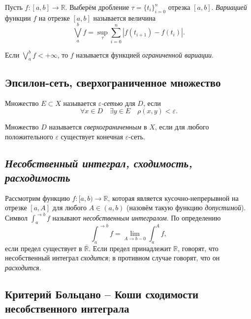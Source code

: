 \begin{definition}
	Пусть \(f \colon [a, b] \to \mathbb{R}\). Выберём дробление \(\tau = \{t_i\}_{i = 0}^n\) отрезка \([a, b]\). \textit{Вариацией}  функции \(f\) на отрезке \([a, b]\) называется величина \[
		\bigvee_a^b f = \sup_\tau \sum_{i = 0}^n |f(t_{i + 1}) - f(t_i)|.
	\]
\end{definition}

\begin{remark}
	Если \(\bigvee\limits_a^b f < +\infty\), то \(f\) называется функцией \textit{ограниченной вариации}.
\end{remark}

\subsection{Эпсилон-сеть, сверхограниченное множество}

\begin{definition}
	Множество \(E \subset X\) называется \textit{\(\varepsilon\)-сетью} для \(D\), если \[
		\forall x \in D \quad \exists y \in E \quad \rho(x, y) < \varepsilon.
	\]
\end{definition}

\begin{definition}
	Множество \(D\) называется \textit{сверхограниченным} в \(X\), если для любого положительного \(\varepsilon\) существует конечная \(\varepsilon\)-сеть.
\end{definition}

\subsection{\itshape Несобственный интеграл, сходимость, расходимость}

\begin{definition}
	Рассмотрим функцию \(f \colon [a, b) \to \mathbb{R}\), которая является кусочно-непрерывной на отрезке \([a, A]\) для любого \(A \in (a, b)\) (назовём такую функцию \textit{допустимой}). Символ \(\int_a^{\to b} f\) называют \textit{несобственным интегралом}. По определению \[
		\int_a^{\to b} f = \lim_{A \to b - 0} \int_a^A f,
	\]
	если предел существует в \(\overline{\mathbb{R}}\). Если предел принадлежит \(\mathbb{R}\), говорят, что несобственный интеграл \textit{сходится}; в противном случае говорят, что он \textit{расходится}.
\end{definition}

\subsection{Критерий Больцано -- Коши сходимости несобственного интеграла}


